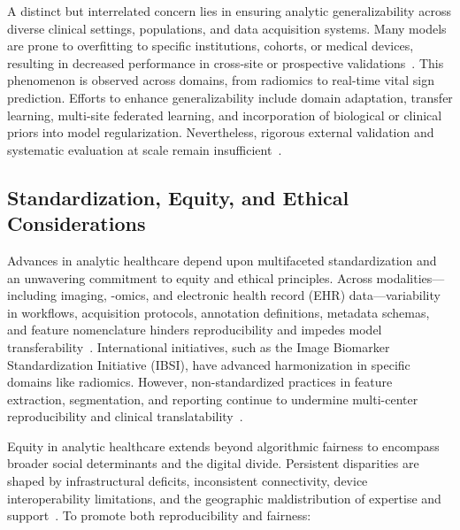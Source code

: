 \documentclass[sigconf]{acmart}
\begin{document}
A distinct but interrelated concern lies in ensuring analytic generalizability across diverse clinical settings, populations, and data acquisition systems. Many models are prone to overfitting to specific institutions, cohorts, or medical devices, resulting in decreased performance in cross-site or prospective validations~\cite{ref28, ref32, ref53, ref65, ref73, ref98, ref106}. This phenomenon is observed across domains, from radiomics to real-time vital sign prediction. Efforts to enhance generalizability include domain adaptation, transfer learning, multi-site federated learning, and incorporation of biological or clinical priors into model regularization. Nevertheless, rigorous external validation and systematic evaluation at scale remain insufficient~\cite{ref28, ref70, ref73, ref78, ref80, ref98, ref99, ref106}.

\subsection{Standardization, Equity, and Ethical Considerations}

Advances in analytic healthcare depend upon multifaceted standardization and an unwavering commitment to equity and ethical principles. Across modalities—including imaging, -omics, and electronic health record (EHR) data—variability in workflows, acquisition protocols, annotation definitions, metadata schemas, and feature nomenclature hinders reproducibility and impedes model transferability~\cite{ref44,ref45,ref46,ref50,ref54,ref55,ref60,ref61,ref62,ref63,ref64,ref65,ref74,ref75,ref78,ref5,ref44,ref46,ref50,ref54,ref53,ref55,ref61,ref62,ref64,ref65,ref66,ref67,ref71,ref72,ref74,ref75,ref76,ref78,ref79,ref80,ref84,ref90,ref106}. International initiatives, such as the Image Biomarker Standardization Initiative (IBSI), have advanced harmonization in specific domains like radiomics. However, non-standardized practices in feature extraction, segmentation, and reporting continue to undermine multi-center reproducibility and clinical translatability~\cite{ref46,ref54,ref55,ref65,ref74,ref75,ref78,ref90,ref106}.

Equity in analytic healthcare extends beyond algorithmic fairness to encompass broader social determinants and the digital divide. Persistent disparities are shaped by infrastructural deficits, inconsistent connectivity, device interoperability limitations, and the geographic maldistribution of expertise and support~\cite{ref61,ref63,ref65,ref69,ref78,ref79,ref82,ref84,ref85,ref90,ref106}. To promote both reproducibility and fairness:
\end{document}
